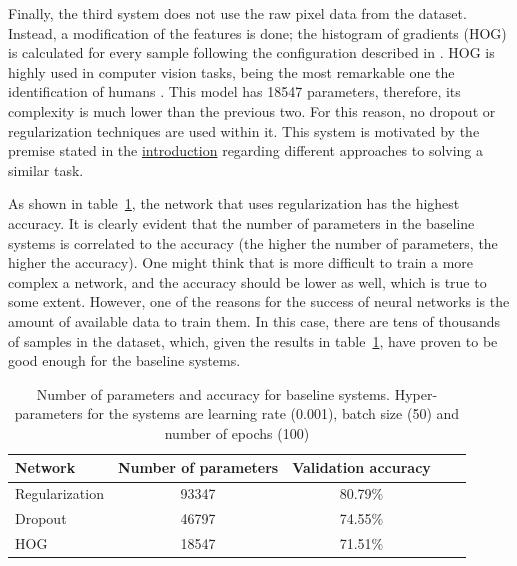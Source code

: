 \documentclass{article}
\begin{document}
Finally, the third system does not use the raw pixel data from the dataset. Instead, a modification of the features is done; the histogram of gradients (HOG) is calculated for every sample following the configuration described in \citep{banjare2016numeric}. HOG is highly used in computer vision tasks, being the most remarkable one the identification of humans \citep{dalal2005histograms}. This model has 18547 parameters, therefore, its complexity is much lower than the previous two. For this reason, no dropout or regularization techniques are used within it. This system is motivated by the premise stated in the \hyperref[sec:intro]{introduction} regarding different approaches to solving a similar task.

As shown in table~\ref{tab:baseline-systems-table}, the network that uses regularization has the highest accuracy. It is clearly evident that the number of parameters in the baseline systems is correlated to the accuracy (the higher the number of parameters, the higher the accuracy). One might think that is more difficult to train a more complex a network, and the accuracy should be lower as well, which is true to some extent. However, one of the reasons for the success of neural networks is the amount of available data to train them. In this case, there are tens of thousands of samples in the dataset, which, given the results in table~\ref{tab:baseline-systems-table}, have proven to be good enough for the baseline systems.

\begin{table}[tb]
\vskip 3mm
\begin{center}
\begin{small}
\begin{sc}
\begin{tabular}{lcccr}
\hline
\abovespace\belowspace
Network & Number of parameters & Validation accuracy \\
\hline
\abovespace
Regularization	& 93347 & 80.79\% \\
Dropout    		& 46797 & 74.55\% \\
HOG			    & 18547 & 71.51\% \\

\hline
\end{tabular}
\end{sc}
\end{small}
\caption{Number of parameters and accuracy for baseline systems. Hyper-parameters for the systems are learning rate (0.001), batch size (50) and number of epochs (100)}
\label{tab:baseline-systems-table}
\end{center}
\vskip -3mm
\end{table}
\end{document}
